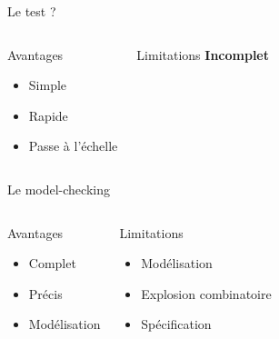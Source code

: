 \documentclass{beamer}
\begin{document}
\appendix

\begin{frame}{Le test ?}


  \begin{columns}[onlytextwidth, T]
  \begin{exampleblock}{Avantages}
    \begin{itemize}
    \item Simple
    \item Rapide
    \item Passe à l'échelle
    \end{itemize}
  \end{exampleblock}

  \begin{alertblock}{Limitations}
    \textbf{Incomplet}
  \end{alertblock}
  \end{columns}
\end{frame}

\begin{frame}{Le model-checking}


  \begin{columns}[onlytextwidth, T]
  \begin{exampleblock}{Avantages}
    \begin{itemize}
    \item Complet
    \item Précis
    \item Modélisation
    \end{itemize}
  \end{exampleblock}

  \begin{alertblock}{Limitations}
    \begin{itemize}
    \item Modélisation
    \item Explosion combinatoire
    \item Spécification
    \end{itemize}
  \end{alertblock}
  \end{columns}
\end{frame}
\end{document}
